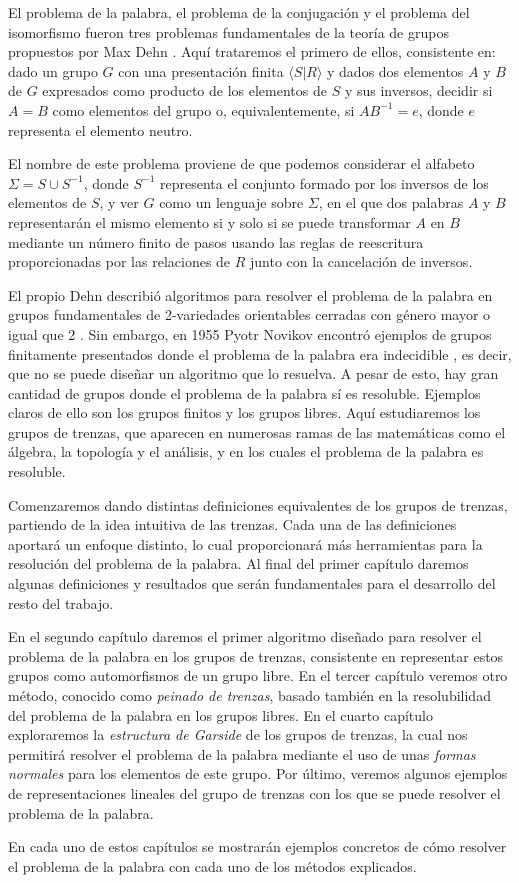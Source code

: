 \documentclass[TFG.tex]{subfiles}
\begin{document}

El problema de la palabra, el problema de la conjugación y el problema del isomorfismo fueron tres problemas fundamentales de la teoría de grupos propuestos por Max Dehn \cite{Dehn11}. Aquí trataremos el primero de ellos, consistente en: dado un grupo $G$ con una presentación finita $\langle S| R\rangle$ y dados dos elementos $A$ y $B$ de $G$ expresados como producto de los elementos de $S$ y sus inversos, decidir si $A=B$ como elementos del grupo o, equivalentemente, si $AB^{-1}=e$, donde $e$ representa el elemento neutro.

El nombre de este problema proviene de que podemos considerar el alfabeto $\Sigma=S\cup S^{-1}$, donde $S^{-1}$ representa el conjunto formado por los inversos de los elementos de $S$, y ver $G$ como un lenguaje sobre $\Sigma$, en el que dos palabras $A$ y $B$ representarán el mismo elemento si y solo si se puede transformar $A$ en $B$ mediante un número finito de pasos usando las reglas de reescritura proporcionadas por las relaciones de $R$ junto con la cancelación de inversos.  

El propio Dehn describió algoritmos para resolver el problema de la palabra en grupos fundamentales de 2-variedades orientables cerradas con género mayor o igual que 2 \cite{Dehn12}. Sin embargo, en 1955 Pyotr Novikov encontró ejemplos de grupos finitamente presentados donde el problema de la palabra era indecidible \cite{Novikov}, es decir, que no se puede diseñar un algoritmo que lo resuelva. A pesar de esto, hay gran cantidad de grupos donde el problema de la palabra sí es resoluble. Ejemplos claros de ello son los grupos finitos y los grupos libres. Aquí estudiaremos los grupos de trenzas, que aparecen en numerosas ramas de las matemáticas como el álgebra, la topología y el análisis, y en los cuales el problema de la palabra es resoluble.

Comenzaremos dando distintas definiciones equivalentes de los grupos de trenzas, partiendo de la idea intuitiva de las trenzas. Cada una de las definiciones aportará un enfoque distinto, lo cual proporcionará más herramientas para la resolución del problema de la palabra. Al final del primer capítulo daremos algunas definiciones y resultados que serán fundamentales para el desarrollo del resto del trabajo. 

En el segundo capítulo daremos el primer algoritmo diseñado para resolver el problema de la palabra en los grupos de trenzas, consistente en representar estos grupos como automorfismos de un grupo libre. En el tercer capítulo veremos otro método, conocido como \emph{peinado de trenzas}, basado también en la resolubilidad del problema de la palabra en los grupos libres. En el cuarto capítulo exploraremos la \emph{estructura de Garside} de los grupos de trenzas, la cual nos permitirá resolver el problema de la palabra mediante el uso de unas \emph{formas normales} para los elementos de este grupo. Por último, veremos algunos ejemplos de representaciones lineales del grupo de trenzas con los que se puede resolver el problema de la palabra. 

En cada uno de estos capítulos se mostrarán ejemplos concretos de cómo resolver el problema de la palabra con cada uno de los métodos explicados. 
\end{document}
